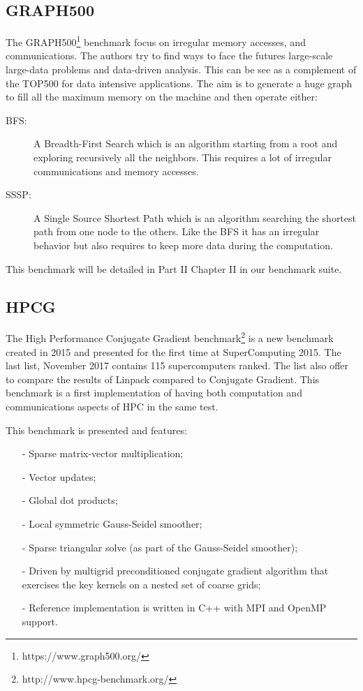 \subsection{GRAPH500}
The GRAPH500\footnote{https://www.graph500.org/} benchmark\cite{murphy2010introducing} focus on irregular memory accesses, and communications.
The authors try to find ways to face the futures large-scale large-data problems and data-driven analysis.
This can be see as a complement of the TOP500 for data intensive applications.
The aim is to generate a huge graph to fill all the maximum memory on the machine and then operate either:
\begin{description}
  \item[BFS:] A Breadth-First Search which is an algorithm starting from a root and exploring recursively all the neighbors. 
  This requires a lot of irregular communications and memory accesses. 
  \item[SSSP:] A Single Source Shortest Path which is an algorithm searching the shortest path from one node to the others. 
  Like the BFS it has an irregular behavior but also requires to keep more data during the computation.
\end{description}

This benchmark will be detailed in Part II Chapter II in our benchmark suite. 

\subsection{HPCG}
The High Performance Conjugate Gradient benchmark\footnote{http://www.hpcg-benchmark.org/} is a new benchmark created in 2015 and presented for the first time at SuperComputing 2015. 
The last list, November 2017 contains 115 supercomputers ranked. 
The list also offer to compare the results of Linpack compared to Conjugate Gradient. 
This benchmark is a first implementation of having both computation and 
communications aspects of HPC in the same test. 

This benchmark is presented and features:
\begin{itemize}[noitemsep,nolistsep]
\item[-] Sparse matrix-vector multiplication;
\item[-] Vector updates;
\item[-] Global dot products;
\item[-] Local symmetric Gauss-Seidel smoother;
\item[-] Sparse triangular solve (as part of the Gauss-Seidel smoother);
\item[-] Driven by multigrid preconditioned conjugate gradient algorithm that exercises the key kernels on a nested set of coarse grids;
\item[-] Reference implementation is written in C++ with MPI and OpenMP support.\\
\end{itemize}

